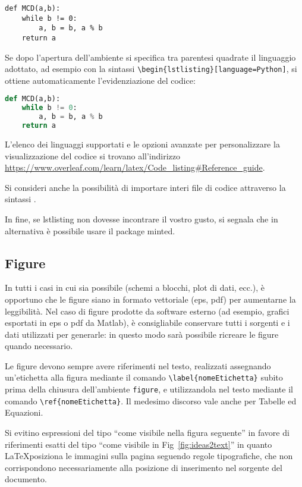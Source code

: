 \documentclass[12pt]{report}
\begin{document}
\begin{lstlisting}
def MCD(a,b):
	while b != 0:
		a, b = b, a % b
	return a
\end{lstlisting}

Se dopo l'apertura dell'ambiente si specifica tra parentesi quadrate il linguaggio adottato, ad esempio con la sintassi \verb|\begin{lstlisting}[language=Python]|, si ottiene automaticamente l'evidenziazione del codice:

\begin{lstlisting}[language=Python]
def MCD(a,b):
	while b != 0:
		a, b = b, a % b
	return a
\end{lstlisting}

L'elenco dei linguaggi supportati e le opzioni avanzate per personalizzare la visualizzazione del codice si trovano all'indirizzo \url{https://www.overleaf.com/learn/latex/Code_listing#Reference_guide}.

Si consideri anche la possibilità di importare interi file di codice attraverso la sintassi \verb||.

In fine, se lstlisting non dovesse incontrare il vostro gusto, si segnala che in alternativa è possibile usare il package minted.

\subsection{Figure}

In tutti i casi in cui sia possibile (schemi a blocchi, plot di dati, ecc.), \`e opportuno che le figure siano in formato vettoriale (eps, pdf) per aumentarne la leggibilit\`a.
Nel caso di figure prodotte da software esterno (ad esempio, grafici esportati in eps o pdf da Matlab), \`e consigliabile conservare tutti i sorgenti e i dati utilizzati per generarle: in questo modo sarà possibile ricreare le figure quando necessario.

Le figure devono sempre avere riferimenti nel testo, realizzati assegnando un'etichetta alla figura mediante il comando \verb|\label{nomeEtichetta}| subito prima della chiusura dell'ambiente \verb|figure|, e utilizzandola nel testo mediante il comando \verb|\ref{nomeEtichetta}|. Il medesimo discorso vale anche per Tabelle ed Equazioni.

Si evitino espressioni del tipo ``come visibile nella figura seguente'' in favore di riferimenti esatti del tipo ``come visibile in Fig~\ref{fig:ideas2text}'' in quanto \LaTeX posiziona le immagini sulla pagina seguendo regole tipografiche, che non corrispondono necessariamente alla posizione di inserimento nel sorgente del documento.
\end{document}
